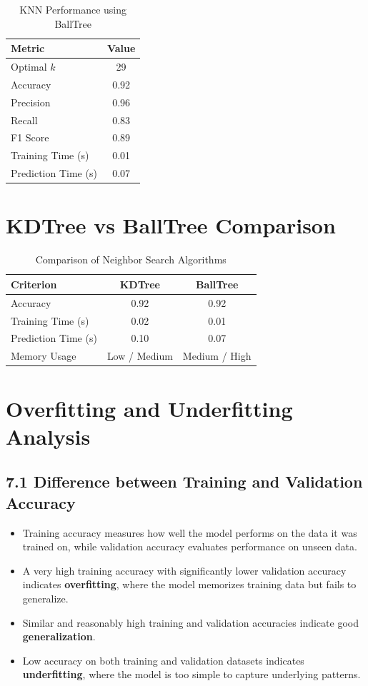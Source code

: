 \documentclass[11pt]{article}
\begin{document}
\begin{table}[H]
\centering
\renewcommand{\arraystretch}{1.3}
\caption{KNN Performance using BallTree}
\begin{tabular}{|l|c|}
\hline
Metric & Value \\
\hline
Optimal $k$ & 29 \\
Accuracy & 0.92 \\
Precision & 0.96 \\
Recall & 0.83 \\
F1 Score & 0.89 \\
Training Time (s) & 0.01 \\
Prediction Time (s) & 0.07 \\
\hline
\end{tabular}
\end{table}

\section*{KDTree vs BallTree Comparison}
\begin{table}[H]
\centering
\renewcommand{\arraystretch}{1.3}
\caption{Comparison of Neighbor Search Algorithms}
\begin{tabular}{|l|c|c|}
\hline
Criterion & KDTree & BallTree \\
\hline
Accuracy & 0.92 & 0.92 \\
Training Time (s) & 0.02 & 0.01 \\
Prediction Time (s) & 0.10 & 0.07 \\
Memory Usage & Low / Medium & Medium / High \\
\hline
\end{tabular}
\end{table}

\section{Overfitting and Underfitting Analysis}

\subsection*{7.1 Difference between Training and Validation Accuracy}
\begin{itemize}
    \item Training accuracy measures how well the model performs on the data it was trained on, while validation accuracy evaluates performance on unseen data.
    \item A very high training accuracy with significantly lower validation accuracy indicates \textbf{overfitting}, where the model memorizes training data but fails to generalize.
    \item Similar and reasonably high training and validation accuracies indicate good \textbf{generalization}.
    \item Low accuracy on both training and validation datasets indicates \textbf{underfitting}, where the model is too simple to capture underlying patterns.
\end{itemize}
\end{document}
